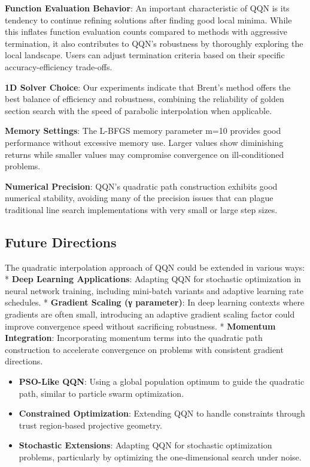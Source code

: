 \textbf{Function Evaluation Behavior}: An important characteristic of QQN is its tendency to continue refining solutions after finding good local minima.
While this inflates function evaluation counts compared to methods with aggressive termination, it also contributes to QQN's robustness by thoroughly exploring the local landscape.
Users can adjust termination criteria based on their specific accuracy-efficiency trade-offs.

\textbf{1D Solver Choice}: Our experiments indicate that Brent's method offers the best balance of efficiency and robustness, combining the reliability of golden section search with the speed of parabolic interpolation when applicable.

\textbf{Memory Settings}: The L-BFGS memory parameter m=10 provides good performance without excessive memory use.
Larger values show diminishing returns while smaller values may compromise convergence on ill-conditioned problems.

\textbf{Numerical Precision}: QQN's quadratic path construction exhibits good numerical stability, avoiding many of the precision issues that can plague traditional line search implementations with very small or large step sizes.

\hypertarget{future-directions}{%
\subsection{Future Directions}\label{future-directions}}

The quadratic interpolation approach of QQN could be extended in various ways:
* \textbf{Deep Learning Applications}: Adapting QQN for stochastic optimization in neural network training, including mini-batch variants and adaptive learning rate schedules.
* \textbf{Gradient Scaling (γ parameter)}: In deep learning contexts where gradients are often small, introducing an adaptive gradient scaling factor could improve convergence speed without sacrificing robustness.
* \textbf{Momentum Integration}: Incorporating momentum terms into the quadratic path construction to accelerate convergence on problems with consistent gradient directions.

\begin{itemize}
\tightlist
\item
  \textbf{PSO-Like QQN}: Using a global population optimum to guide the quadratic path, similar to particle swarm optimization.
\item
  \textbf{Constrained Optimization}: Extending QQN to handle constraints through trust region-based projective geometry.
\item
  \textbf{Stochastic Extensions}: Adapting QQN for stochastic optimization problems, particularly by optimizing the one-dimensional search under noise.
\end{itemize}

